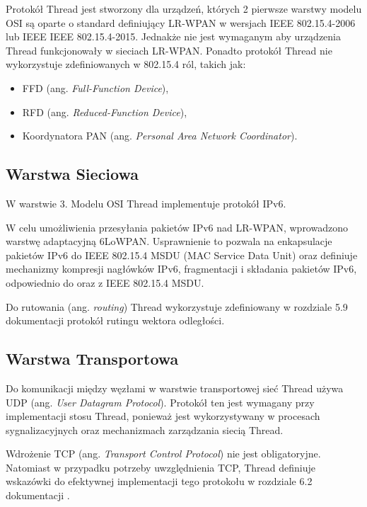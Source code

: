         Protokół Thread jest stworzony dla urządzeń, których 2 pierwsze warstwy modelu OSI są oparte o standard definiujący LR-WPAN w wersjach IEEE 802.15.4-2006 lub IEEE IEEE 802.15.4-2015. Jednakże nie jest wymaganym aby urządzenia Thread funkcjonowały w sieciach LR-WPAN. Ponadto protokół Thread nie wykorzystuje zdefiniowanych w 802.15.4 ról, takich jak:
        \begin{itemize}
            \item FFD (ang. \textit{Full-Function Device}),
            \item RFD (ang. \textit{Reduced-Function Device}),
            \item Koordynatora PAN (ang. \textit{Personal Area Network Coordinator}).
        \end{itemize}

    \subsection{Warstwa Sieciowa}

        W warstwie 3. Modelu OSI Thread implementuje protokół IPv6.
        
        W celu umożliwienia przesyłania pakietów IPv6 nad LR-WPAN, wprowadzono warstwę adaptacyjną 6LoWPAN. Usprawnienie to pozwala na enkapsulacje pakietów IPv6 do IEEE 802.15.4 MSDU (MAC Service Data Unit) oraz definiuje mechanizmy kompresji nagłówków IPv6, fragmentacji i składania pakietów IPv6, odpowiednio do oraz z IEEE 802.15.4 MSDU.
        
        Do rutowania (ang. \textit{routing}) Thread wykorzystuje zdefiniowany w rozdziale 5.9 dokumentacji \cite{thread-1.3.0} protokół rutingu wektora odległości.

    \subsection{Warstwa Transportowa}
    
        Do komunikacji między węzłami w warstwie transportowej sieć Thread używa UDP (ang. \textit{User Datagram Protocol}). Protokół ten jest wymagany przy implementacji stosu Thread, ponieważ jest wykorzystywany w procesach sygnalizacyjnych oraz mechanizmach zarządzania siecią Thread.
    
        Wdrożenie TCP (ang. \textit{Transport Control Protocol}) nie jest obligatoryjne. Natomiast w przypadku potrzeby uwzględnienia TCP, Thread definiuje wskazówki do efektywnej implementacji tego protokołu w rozdziale 6.2 dokumentacji \cite{thread-1.3.0}.

